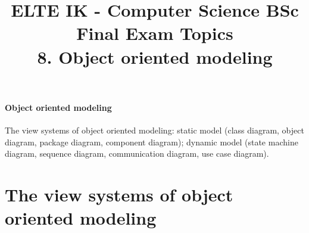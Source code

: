\documentclass[margin=0px]{article}
\title{\textbf{{\Large ELTE IK - Computer Science BSc} \vspace{0.2cm} \\ {\huge Final Exam Topics}} \vspace{0.3cm} \\ 8. Object oriented modeling}
\author{}
\date{}
\newenvironment{tetel}[1]{\paragraph{#1 \\}}{}
\begin{document}
\maketitle

\begin{center}
\end{center}

\begin{tetel}{Object oriented modeling}
    The view systems of object oriented modeling: static model (class diagram, object diagram, package diagram, component diagram); dynamic model (state machine diagram, sequence diagram, communication diagram, use case diagram).
\end{tetel}

\section{The view systems of object oriented modeling}
\end{document}
